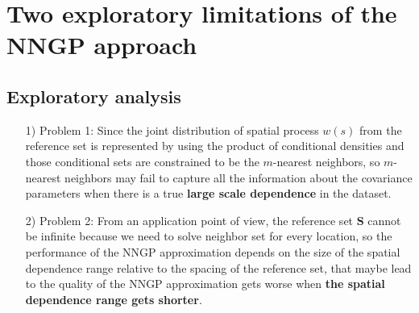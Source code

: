 \documentclass[
12pt, %
a4paper, %
oneside, %
headinclude,footinclude, %
BCOR5mm, %
]{scrartcl}
\begin{document}
\section{Two exploratory limitations of the NNGP approach}
\subsection{Exploratory analysis }
\begin{itemize}
 \item [1)]Problem 1: Since the joint distribution of spatial process $w(s)$ from the reference set is represented by using the product of conditional densities and those conditional sets are constrained to be the $m$-nearest neighbors, so $m$-nearest neighbors may fail to capture all the information about the covariance parameters when there is a true \textbf{large scale dependence} in the dataset.
 \item [2)]Problem 2: From an application point of view, the reference set $\boldsymbol{S}$ cannot be infinite because we need to solve neighbor set for every location, so the performance of the NNGP approximation depends on the size of the spatial dependence range relative to the spacing of the reference set, that maybe lead to the quality of the NNGP approximation gets worse when \textbf{the spatial dependence range gets shorter}.
\end{itemize}

\end{document}
